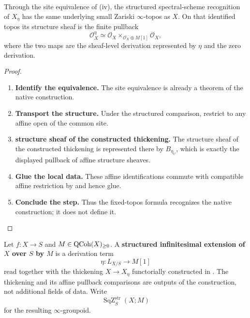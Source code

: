 \begin{corollary}
\label{cor:global-square-zero-fixed-site-recognition}
Through the site equivalence of
\textup{(iv)}, the
structured spectral-scheme recognition of \(X_\eta\) has the same underlying
small Zariski \(\infty\)-topos as \(X\). On that identified topos its
structure sheaf is the finite pullback
\[
    \mathcal O_X^\eta
    \simeq
    \mathcal O_X
    \times_{\mathcal O_X\oplus M[1]}
    \mathcal O_X,
\]
where the two maps are the sheaf-level derivation represented by \(\eta\) and
the zero derivation.
\end{corollary}

\begin{proof}
\leavevmode
\begin{enumerate}[label=\textup{(\arabic*)}]
    \item \textbf{Identify the equivalence.}
    The site equivalence is already a theorem of the native construction.

    \item \textbf{Transport the structure.}
    Under the structured comparison, restrict to any affine open of the common site.

    \item \textbf{structure sheaf of the constructed thickening.}
    The structure sheaf of the constructed thickening is represented there by \(B_{\eta_U}\), which
    is exactly the displayed pullback of affine structure sheaves.

    \item \textbf{Glue the local data.}
    These affine identifications commute with compatible affine restriction by
     and hence glue.

    \item \textbf{Conclude the step.}
    Thus the fixed-topos formula recognizes the native construction; it does not define it.
\end{enumerate}
\end{proof}

\begin{definition}
\label{def:structured-infinitesimal-extension-global}
Let \(f:X\to S\) and \(M\in\operatorname{QCoh}(X)_{\geq0}\). A \textbf{structured
infinitesimal extension of \(X\) over \(S\) by \(M\)} is a derivation term
\[
    \eta:L_{X/S}\longrightarrow M[1]
\]
read together with the thickening \(X\to X_\eta\) functorially constructed in
. The thickening and its affine
pullback comparisons are outputs of the construction, not additional fields
of data. Write
\[
    \operatorname{SqZ}^{\mathrm{str}}_S(X;M)
\]
for the resulting \(\infty\)-groupoid.
\end{definition}

